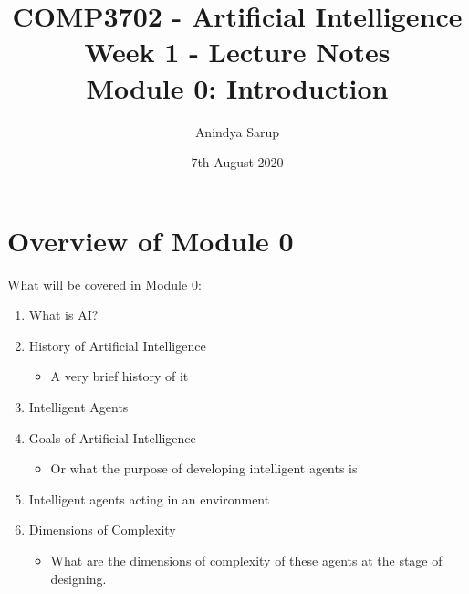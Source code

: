 \documentclass[12pt]{article}
\title{%
    COMP3702 - Artificial Intelligence \\
        Week 1 - Lecture Notes \\
        Module 0: Introduction}
\author{Anindya Sarup}
\date{7th August 2020}
\begin{document}
\maketitle

\section*{Overview of Module 0}

What will be covered in Module 0:
\begin{enumerate}
    \item What is AI?
    \item History of Artificial Intelligence
    \begin{itemize}
        \item A very brief history of it
    \end{itemize}
    \item Intelligent Agents
    \item Goals of Artificial Intelligence
    \begin{itemize}
        \item Or what the purpose of developing intelligent agents is
    \end{itemize}
    \item Intelligent agents acting in an environment
    \item Dimensions of Complexity
    \begin{itemize}
        \item What are the dimensions of complexity of these agents at the stage of designing.
    \end{itemize}
\end{enumerate}
\end{document}
